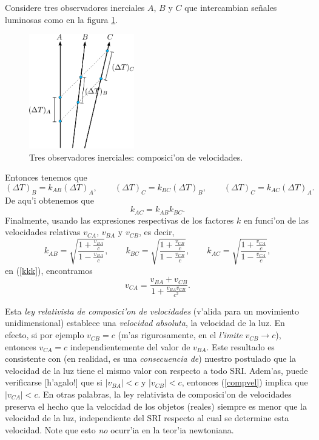 Considere tres observadores inerciales $A$, $B$ y $C$ que intercambian se\~nales
luminosas como en la figura \ref{k3}.
\begin{figure}[!h]
\centerline{\includegraphics[height= 5cm]{fig/fig-diagrama-composicion-velocidades.pdf}}
 \caption{Tres observadores inerciales: composici'on de velocidades.}
\label{k3}
\end{figure}
 Entonces tenemos que
\begin{equation}
(\Delta T)_B=k_{AB} (\Delta T)_A, \qquad (\Delta T)_C=k_{BC} (\Delta T)_B,
\qquad (\Delta T)_C=k_{AC} (\Delta T)_A.
\end{equation}
De aqu'i obtenemos que
\begin{equation}
k_{AC}=k_{AB}k_{BC}.\label{kkk}
\end{equation}
Finalmente, usando las expresiones respectivas de los factores $k$ en funci'on
de las velocidades relativas $v_{CA}$, $v_{BA}$ y $v_{CB}$, es decir,
\begin{equation}
k_{AB}=\sqrt{\frac{1+\frac{v_{BA}}{c}}{1-\frac{v_{BA}}{c}}}, \qquad k_{BC}=\sqrt{\frac{1+\frac{v_{CB}}{c}}{1-\frac{v_{CB}}{c}}} , \qquad k_{AC}=\sqrt{\frac{1+\frac{v_{CA}}{c}}{1-\frac{v_{CA}}{c}}},
\end{equation}
en (\ref{kkk}), encontramos
\begin{equation}
\boxed{v_{CA}=\frac{v_{BA}+v_{CB}}{1+\frac{v_{BA}v_{CB}}{c^2}}.} \label{compvel}
\end{equation}

Esta \textit{ley relativista de composici'on de velocidades} (v'alida para un movimiento unidimensional) establece una \textit{velocidad absoluta}, la
velocidad de la luz. En efecto, si por ejemplo $v_{CB}=c$ (m'as rigurosamente, en el \textit{l'imite} $v_{CB}\to c$), entonces $v_{CA}=c$ independientemente del valor de $v_{BA}$. Este resultado es consistente con (en realidad, es una \textit{consecuencia de}) nuestro postulado que la velocidad de la luz tiene el mismo valor con respecto a todo SRI. Adem'as, puede verificarse [h'agalo!] que si $|v_{BA}|<c$ y $|v_{CB}|<c$, entonces  (\ref{compvel}) implica que $|v_{CA}|<c$. En otras palabras, la ley relativista de composici'on de velocidades preserva el hecho que la velocidad de los objetos (reales) siempre es menor que la velocidad de la luz, independiente del SRI respecto al cual se determine esta velocidad. Note que esto \textit{no} ocurr'ia en la teor'ia newtoniana.


